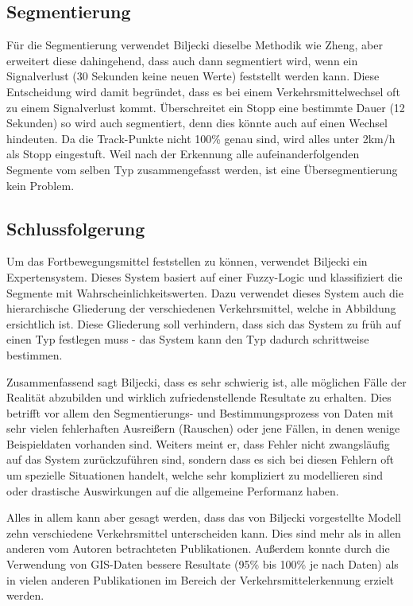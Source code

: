 \subsection{Segmentierung}
Für die Segmentierung verwendet Biljecki dieselbe Methodik wie Zheng, aber erweitert diese dahingehend, dass auch dann segmentiert wird, wenn ein Signalverlust (30 Sekunden keine neuen Werte) feststellt werden kann. Diese Entscheidung wird damit begründet, dass es bei einem Verkehrsmittelwechsel oft zu einem Signalverlust kommt. 
Überschreitet ein Stopp eine bestimmte Dauer (12 Sekunden) so wird auch segmentiert, denn dies könnte auch auf einen Wechsel hindeuten. Da die Track-Punkte nicht 100\% genau sind, wird alles unter 2km/h als Stopp eingestuft. Weil nach der Erkennung alle aufeinanderfolgenden Segmente vom selben Typ zusammengefasst werden, ist eine Übersegmentierung kein Problem.

\subsection{Schlussfolgerung}
Um das Fortbewegungsmittel feststellen zu können, verwendet Biljecki ein Expertensystem. Dieses System basiert auf einer Fuzzy-Logic und klassifiziert die Segmente mit Wahrscheinlichkeitswerten. Dazu verwendet dieses System auch die hierarchische Gliederung der verschiedenen Verkehrsmittel, welche in Abbildung  ersichtlich ist. Diese Gliederung soll verhindern, dass sich das System zu früh auf einen Typ festlegen muss - das System kann den Typ dadurch schrittweise bestimmen.


Zusammenfassend sagt Biljecki, dass es sehr schwierig ist, alle möglichen Fälle der Realität abzubilden und wirklich zufriedenstellende Resultate zu erhalten. Dies betrifft vor allem den Segmentierungs- und Bestimmungsprozess von Daten mit sehr vielen fehlerhaften Ausreißern (Rauschen) oder jene Fällen, in denen wenige Beispieldaten vorhanden sind. Weiters meint er, dass Fehler nicht zwangsläufig auf das System zurückzuführen sind, sondern dass es sich bei diesen Fehlern oft um spezielle Situationen handelt, welche sehr kompliziert zu modellieren sind oder drastische Auswirkungen auf die allgemeine Performanz haben.

Alles in allem kann aber gesagt werden, dass das von Biljecki vorgestellte Modell zehn verschiedene Verkehrsmittel unterscheiden kann. Dies sind mehr als in allen anderen vom Autoren betrachteten Publikationen. Außerdem konnte durch die Verwendung von GIS-Daten bessere Resultate (95\% bis 100\% je nach Daten) als in vielen anderen Publikationen im Bereich der Verkehrsmittelerkennung erzielt werden. 

